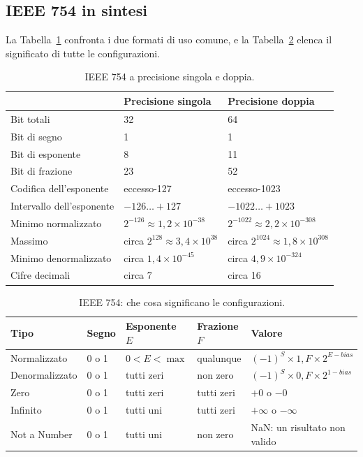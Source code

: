 \subsection{IEEE 754 in sintesi}

La Tabella~\ref{tab:real:formats} confronta i due formati di uso comune, e la
Tabella~\ref{tab:real:special} elenca il significato di tutte le
configurazioni.

\begin{table}[htb]
\centering\small
\caption{IEEE 754 a precisione singola e doppia.}\label{tab:real:formats}
\begin{tabular}{@{}lll@{}}
\toprule
 & \textbf{Precisione singola} & \textbf{Precisione doppia}\\
\midrule
Bit totali & 32 & 64\\
Bit di segno & 1 & 1\\
Bit di esponente & 8 & 11\\
Bit di frazione & 23 & 52\\
Codifica dell'esponente & eccesso-127 & eccesso-1023\\
Intervallo dell'esponente & $-126\ldots+127$ & $-1022\ldots+1023$\\
Minimo normalizzato & $2^{-126}\approx 1,2\times 10^{-38}$ & $2^{-1022}\approx 2,2\times 10^{-308}$\\
Massimo & circa $2^{128}\approx 3,4\times 10^{38}$ & circa $2^{1024}\approx 1,8\times 10^{308}$\\
Minimo denormalizzato & circa $1,4\times 10^{-45}$ & circa $4,9\times 10^{-324}$\\
Cifre decimali & circa 7 & circa 16\\
\bottomrule
\end{tabular}
\end{table}

\begin{table}[htb]
\centering\small
\caption{IEEE 754: che cosa significano le configurazioni.}\label{tab:real:special}
\begin{tabular}{@{}lllll@{}}
\toprule
\textbf{Tipo} & \textbf{Segno} & \textbf{Esponente $E$} & \textbf{Frazione $F$} & \textbf{Valore}\\
\midrule
Normalizzato & 0 o 1 & $0<E<\max$ & qualunque & $(-1)^{S}\times 1,F\times 2^{E-\mathit{bias}}$\\
Denormalizzato & 0 o 1 & tutti zeri & non zero & $(-1)^{S}\times 0,F\times 2^{1-\mathit{bias}}$\\
Zero & 0 o 1 & tutti zeri & tutti zeri & $+0$ o $-0$\\
Infinito & 0 o 1 & tutti uni & tutti zeri & $+\infty$ o $-\infty$\\
Not a Number & 0 o 1 & tutti uni & non zero & NaN: un risultato non valido\\
\bottomrule
\end{tabular}
\end{table}

